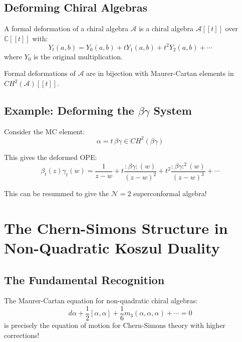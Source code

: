 \subsection{Deforming Chiral Algebras}

\begin{definition}
A formal deformation of a chiral algebra $\mathcal{A}$ is a chiral algebra $\mathcal{A}[[t]]$ over $\mathbb{C}[[t]]$ with:
\[
Y_t(a,b) = Y_0(a,b) + t Y_1(a,b) + t^2 Y_2(a,b) + \cdots
\]
where $Y_0$ is the original multiplication.
\end{definition}

\begin{theorem}
Formal deformations of $\mathcal{A}$ are in bijection with Maurer-Cartan elements in $CH^2(\mathcal{A})[[t]]$.
\end{theorem}

\subsection{Example: Deforming the $\beta\gamma$ System}

Consider the MC element:
\[
\alpha = t \, \beta \gamma \in CH^2(\beta\gamma)
\]

This gives the deformed OPE:
\[
\beta_t(z)\gamma_t(w) = \frac{1}{z-w} + t \frac{:\beta\gamma:(w)}{(z-w)^2} + t^2 \frac{:\beta\gamma:^2(w)}{(z-w)^3} + \cdots
\]

This can be resummed to give the $\mathcal{N}=2$ superconformal algebra!


\section{The Chern-Simons Structure in Non-Quadratic Koszul Duality}

\subsection{The Fundamental Recognition}

The Maurer-Cartan equation for non-quadratic chiral algebras:
\[
d\alpha + \frac{1}{2}[\alpha, \alpha] + \frac{1}{6}m_3(\alpha, \alpha, \alpha) + \cdots = 0
\]
is precisely the equation of motion for Chern-Simons theory with higher corrections!

